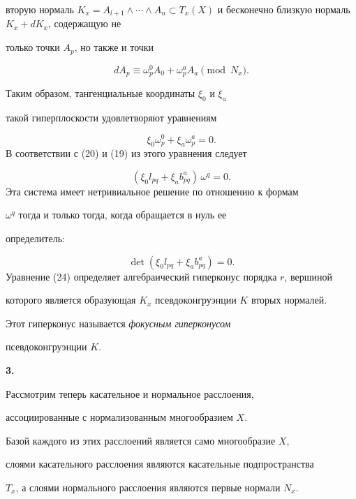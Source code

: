 вторую нормаль $K_x = A_{l+1} \wedge \dotsb \wedge A_n \subset


T_x (X)$ и бесконечно близкую нормаль $K_x + d K_x$, содержащую не


только точки $A_p$, но также и точки


$$


d A_p \equiv \omega_p^0 A_0 + \omega_p^a A_a \pmod{N_x}.


$$


Таким образом, тангенциальные координаты $\xi_0$ и $\xi_a$


такой гиперплоскости удовлетворяют уравнениям


$$


\xi_0 \omega_p^0 + \xi_a\omega_p^a = 0.


$$
В соответствии с (20) и (19) из этого уравнения следует


$$


(\xi_0 l_{pq} + \xi_a b^a_{pq})\, \omega^q = 0.


$$
Эта система имеет нетривиальное решение по отношению к формам


$\omega^q$ тогда и только тогда, когда обращается в нуль ее


определитель:


\begin{equation}\label{eq:33}
\det (\xi_0 l_{pq} + \xi_a b^a_{pq}) = 0.
\end{equation}
Уравнение (24) определяет алгебраический гиперконус порядка $r$, вершиной


которого является образующая $K_x$ псевдоконгруэнции $K$ вторых нормалей.


 Этот гиперконус называется {\it фокусным гиперконусом}


псевдоконгруэнции $K$.


\medskip





{\bf 3.}


Рассмотрим теперь касательное и нормальное расслоения,


ассоциированные с нормализованным многообразием $X$.


Базой каждого из этих расслоений является само многообразие $X$,


слоями касательного расслоения являются касательные подпространства


$T_x$, а слоями нормального расслоения являются первые нормали $N_x$.





